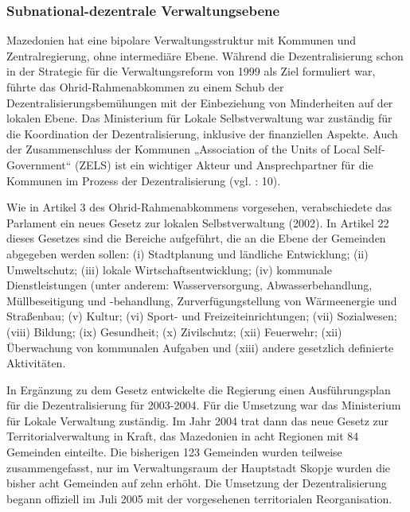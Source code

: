 \subsubsection{Subnational-dezentrale Verwaltungsebene}
Mazedonien hat eine bipolare Verwaltungsstruktur mit Kommunen und Zentralregierung, ohne intermediäre Ebene. Während die Dezentralisierung schon in der Strategie für die Verwaltungsreform von 1999 als Ziel formuliert war, führte das Ohrid-Rahmenabkommen zu einem Schub der Dezentralisierungsbemühungen mit der Einbeziehung von Minderheiten auf der lokalen Ebene. Das Ministerium für Lokale Selbstverwaltung war zuständig für die Koordination der Dezentralisierung, inklusive der finanziellen Aspekte. Auch der Zusammenschluss der Kommunen „Association of the Units of Local Self-Government“ (ZELS) ist ein wichtiger Akteur und Ansprechpartner für die Kommunen im Prozess der Dezentralisierung (vgl. \cite{analyt07}: 10).\par
Wie in Artikel 3 des Ohrid-Rahmenabkommens vorgesehen, verabschiedete das Parlament ein neues Gesetz zur lokalen Selbstverwaltung (2002). In Artikel 22 dieses Gesetzes sind die Bereiche aufgeführt, die an die Ebene der Gemeinden abgegeben werden sollen: (i) Stadtplanung und ländliche Entwicklung; (ii) Umweltschutz; (iii) lokale Wirtschaftsentwicklung; (iv) kommunale Dienstleistungen (unter anderem: Wasserversorgung, Abwasserbehandlung, Müllbeseitigung und -behandlung, Zurverfügungstellung von Wärmeenergie und Straßenbau; (v) Kultur; (vi) Sport- und Freizeiteinrichtungen; (vii) Sozialwesen; (viii) Bildung; (ix) Gesundheit; (x) Zivilschutz; (xii) Feuerwehr; (xii) Überwachung von kommunalen Aufgaben und (xiii) andere gesetzlich definierte Aktivitäten.\par
In Ergänzung zu dem Gesetz entwickelte die Regierung einen Ausführungsplan für die Dezentralisierung für 2003-2004. Für die Umsetzung war das Ministerium für Lokale Verwaltung zuständig. Im Jahr 2004 trat dann das neue Gesetz zur Territorialverwaltung in Kraft, das Mazedonien in acht Regionen mit 84 Gemeinden einteilte. Die bisherigen 123 Gemeinden wurden teilweise zusammengefasst, nur im Verwaltungsraum der Hauptstadt Skopje wurden die bisher acht Gemeinden auf zehn erhöht. Die Umsetzung der Dezentralisierung begann offiziell im Juli 2005 mit der vorgesehenen territorialen Reorganisation. \par
